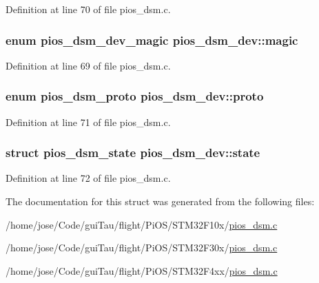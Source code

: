 Definition at line 70 of file pios\-\_\-dsm.\-c.

\hypertarget{structpios__dsm__dev_af1374f09784777b8222cd59d6c41ba1f}{
\subsubsection[{magic}]{\setlength{\rightskip}{0pt plus 5cm}enum {\bf pios\-\_\-dsm\-\_\-dev\-\_\-magic} pios\-\_\-dsm\-\_\-dev\-::magic}}\label{structpios__dsm__dev_af1374f09784777b8222cd59d6c41ba1f}


Definition at line 69 of file pios\-\_\-dsm.\-c.

\hypertarget{structpios__dsm__dev_a1f236c86046b7aa2f08742d1c9c03940}{
\subsubsection[{proto}]{\setlength{\rightskip}{0pt plus 5cm}enum {\bf pios\-\_\-dsm\-\_\-proto} pios\-\_\-dsm\-\_\-dev\-::proto}}\label{structpios__dsm__dev_a1f236c86046b7aa2f08742d1c9c03940}


Definition at line 71 of file pios\-\_\-dsm.\-c.

\hypertarget{structpios__dsm__dev_a03ca4dcf548ecee1772b76d3eefad122}{
\subsubsection[{state}]{\setlength{\rightskip}{0pt plus 5cm}struct {\bf pios\-\_\-dsm\-\_\-state} pios\-\_\-dsm\-\_\-dev\-::state}}\label{structpios__dsm__dev_a03ca4dcf548ecee1772b76d3eefad122}


Definition at line 72 of file pios\-\_\-dsm.\-c.



The documentation for this struct was generated from the following files\-:\begin{DoxyCompactItemize}
\item 
/home/jose/\-Code/gui\-Tau/flight/\-Pi\-O\-S/\-S\-T\-M32\-F10x/\hyperlink{_s_t_m32_f10x_2pios__dsm_8c}{pios\-\_\-dsm.\-c}\item 
/home/jose/\-Code/gui\-Tau/flight/\-Pi\-O\-S/\-S\-T\-M32\-F30x/\hyperlink{_s_t_m32_f30x_2pios__dsm_8c}{pios\-\_\-dsm.\-c}\item 
/home/jose/\-Code/gui\-Tau/flight/\-Pi\-O\-S/\-S\-T\-M32\-F4xx/\hyperlink{_s_t_m32_f4xx_2pios__dsm_8c}{pios\-\_\-dsm.\-c}\end{DoxyCompactItemize}
